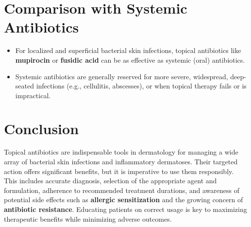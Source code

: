 \documentclass{article}
\begin{document}
\section*{Comparison with Systemic Antibiotics}
\begin{itemize}
    \item For localized and superficial bacterial skin infections, topical antibiotics like \textbf{mupirocin} or \textbf{fusidic acid} can be as effective as systemic (oral) antibiotics.
    \item Systemic antibiotics are generally reserved for more severe, widespread, deep-seated infections (e.g., cellulitis, abscesses), or when topical therapy fails or is impractical.
\end{itemize}

\section*{Conclusion}
Topical antibiotics are indispensable tools in dermatology for managing a wide array of bacterial skin infections and inflammatory dermatoses. Their targeted action offers significant benefits, but it is imperative to use them responsibly. This includes accurate diagnosis, selection of the appropriate agent and formulation, adherence to recommended treatment durations, and awareness of potential side effects such as \textbf{allergic sensitization} and the growing concern of \textbf{antibiotic resistance}. Educating patients on correct usage is key to maximizing therapeutic benefits while minimizing adverse outcomes.
\end{document}
